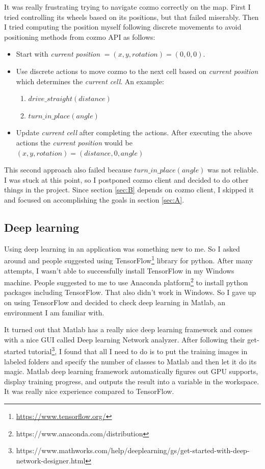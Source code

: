 \documentclass[12pt,a4paper]{article}
\begin{document}
It was really frustrating trying to navigate cozmo correctly on the map. First I tried controlling its wheels based on its positions, but that failed miserably. Then I tried computing the position myself following discrete movements to avoid positioning methods from cozmo API as follows:
\begin{itemize}
\item Start with \textit{current position} $=(x, y, rotation) = (0, 0, 0)$.
\item Use discrete actions to move cozmo to the next cell based on \textit{current position} which determines the \textit{current cell}. An example: 
\begin{enumerate}
\item $drive\_straight(distance)$
\item $turn\_in\_place(angle)$
\end{enumerate}

\item Update \textit{current cell} after completing the actions. After executing the above actions the \textit{current position} would be $(x, y, rotation) = (distance, 0, angle)$
\end{itemize}

This second approach also failed because  $turn\_in\_place(angle)$ was not reliable. I was stuck at this point, so I postponed cozmo client and decided to do other things in the project. Since section \ref{sec:B} depends on cozmo client, I skipped it and focused on accomplishing the goals in section \ref{sec:A}. 

\subsection{Deep learning}
Using deep learning in an application was something new to me. So I asked around and people suggested using 
 TensorFlow\footnote{\url{https://www.tensorflow.org/}} library for python. After many attempts, I wasn't able to successfully install TensorFlow in my Windows machine. People suggested to me to use Anaconda platform\footnote{https://www.anaconda.com/distribution} to install python packages including TensorFlow. That also didn't work in Windows. So I gave up on using TensorFlow and decided to check deep learning in Matlab, an environment I am familiar with. 
 
It turned out that Matlab has a really nice deep learning framework and comes with  a nice GUI called Deep learning Network analyzer. After following their get-started tutorial\footnote{https://www.mathworks.com/help/deeplearning/gs/get-started-with-deep-network-designer.html}, I found that all I need to do is to put the training images in labeled folders and specify the number of classes to Matlab and then let it do its magic. Matlab deep learning framework automatically figures out GPU supports, display training progress, and outputs the result into a variable in the workspace.  It was really nice experience compared to TensorFlow. 
\end{document}
